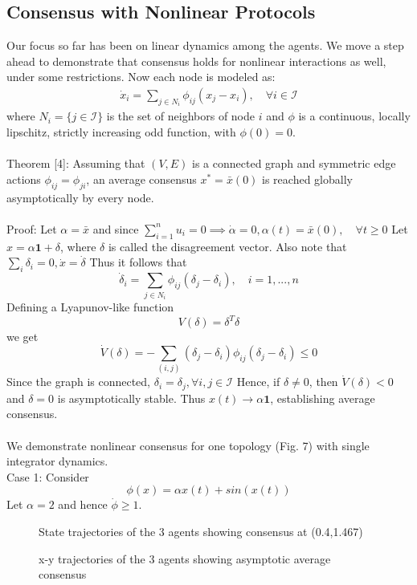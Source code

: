 \documentclass[journal]{IEEEtran}
\begin{document}
\subsection{Consensus with Nonlinear Protocols}
Our focus so far has been on linear dynamics among the agents. We move a step ahead to demonstrate that consensus holds for nonlinear interactions as well, under some restrictions.  Now each node is modeled as: \begin{align} \dot{x}_i = \sum_{j\in N_i} \phi_{ij}(x_j-x_i), \quad \forall i\in\mathcal{I}\end{align} where $N_i = \{j\in \mathcal{I}\}$ is the set of neighbors of node $i$ and $\phi$ is a continuous, locally lipschitz, strictly increasing odd function, with $\phi(0) = 0$. 
\\\\
Theorem [4]: Assuming that $(V,E)$ is a connected graph and symmetric edge actions $\phi_{ij} = \phi_{ji}$, an average consensus $x^* = \bar{x}(0)$ is reached globally asymptotically by every node. 
\\\\
Proof: Let $\alpha = \bar{x}$ and since $\sum_{i=1}^{n}u_i = 0 \implies \dot{\alpha} = 0, \alpha(t) = \bar{x}(0), \quad \forall t \geq 0$ Let $x = \alpha\textbf{1} + \delta$, where $\delta$ is called the disagreement vector. Also note that $\sum_{i}\delta_i = 0, \dot{x} = \dot{\delta}$ Thus it follows that $$\dot{\delta}_i = \sum_{j\in N_i} \phi_{ij}(\delta_j-\delta_i), \quad i = 1,...,n$$ Defining a Lyapunov-like function $$V(\delta) = \delta^T\delta$$ we get $$\dot{V}(\delta) = -\sum_{(i,j)}(\delta_j-\delta_i)\phi_{ij}(\delta_j-\delta_i) \leq 0 $$ Since the graph is connected, $\delta_i = \delta_j,  \forall i,j \in \mathcal{I}$ Hence, if $\delta \neq 0$, then $\dot{V}(\delta) < 0$ and $\delta = 0$ is asymptotically stable. Thus $x(t) \rightarrow \alpha\textbf{1}$, establishing average consensus. \\\\
We demonstrate nonlinear consensus for one topology (Fig. 7) with single integrator dynamics. \\Case 1: Consider $$\phi (x) = \alpha x(t) + sin(x(t))$$  Let $\alpha = 2$ and hence $\dot{\phi} \geq 1$. 
\begin{figure}[h]
\caption{State trajectories of the 3 agents showing consensus at (0.4,1.467)}
\end{figure}
\begin{figure}[h]
\caption{x-y trajectories of the 3 agents showing asymptotic average consensus}
\end{figure}
\end{document}
